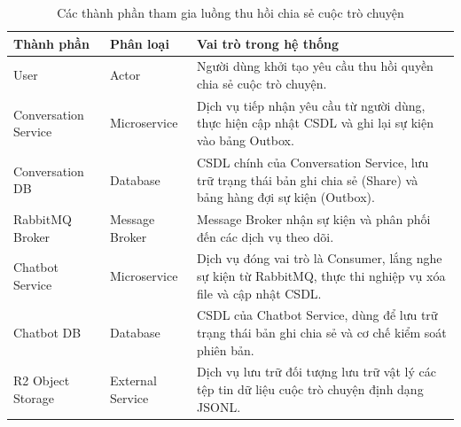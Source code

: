 \begin{table}[H]
\centering
\renewcommand{\arraystretch}{1.3}

\begin{tabular}{|l|l|p{5cm}|}
\hline
\textbf{Thành phần} & \textbf{Phân loại} & \textbf{Vai trò trong hệ thống} \\ \hline
User & Actor & Người dùng khởi tạo yêu cầu thu hồi quyền chia sẻ cuộc trò chuyện. \\ \hline
Conversation Service & Microservice & Dịch vụ tiếp nhận yêu cầu từ người dùng, thực hiện cập nhật CSDL và ghi lại sự kiện vào bảng Outbox. \\ \hline
Conversation DB & Database & CSDL chính của Conversation Service, lưu trữ trạng thái bản ghi chia sẻ (Share) và bảng hàng đợi sự kiện (Outbox). \\ \hline
RabbitMQ Broker & Message Broker & Message Broker nhận sự kiện và phân phối đến các dịch vụ theo dõi. \\ \hline
Chatbot Service & Microservice & Dịch vụ đóng vai trò là Consumer, lắng nghe sự kiện từ RabbitMQ, thực thi nghiệp vụ xóa file và cập nhật CSDL. \\ \hline
Chatbot DB & Database & CSDL của Chatbot Service, dùng để lưu trữ trạng thái bản ghi chia sẻ và cơ chế kiểm soát phiên bản. \\ \hline
R2 Object Storage & External Service & Dịch vụ lưu trữ đối tượng lưu trữ vật lý các tệp tin dữ liệu cuộc trò chuyện định dạng JSONL. \\ \hline
\end{tabular}
\caption{Các thành phần tham gia luồng thu hồi chia sẻ cuộc trò chuyện}
\end{table}
